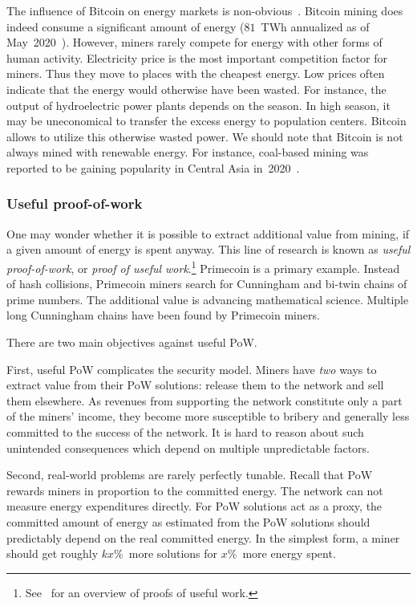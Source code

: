 The influence of Bitcoin on energy markets is non-obvious~\cite{Carter2020}.
Bitcoin mining does indeed consume a significant amount of energy ($81$~TWh annualized as of May~2020~\cite{Rauchs2020}).
However, miners rarely compete for energy with other forms of human activity.
Electricity price is the most important competition factor for miners.
Thus they move to places with the cheapest energy.
Low prices often indicate that the energy would otherwise have been wasted.
For instance, the output of hydroelectric power plants depends on the season.
In high season, it may be uneconomical to transfer the excess energy to population centers.
Bitcoin allows to utilize this otherwise wasted power.
We should note that Bitcoin is not always mined with renewable energy.
For instance, coal-based mining was reported to be gaining popularity in Central Asia in~2020~\cite{8BTCStaff2020}.


\subsubsection*{Useful proof-of-work}

One may wonder whether it is possible to extract additional value from mining, if a given amount of energy is spent anyway.
This line of research is known as \textit{useful proof-of-work}, or \textit{proof of useful work}.\footnote{See~\cite{Ball2017} for an overview of proofs of useful work.}
Primecoin is a primary example.
Instead of hash collisions, Primecoin miners search for Cunningham and bi-twin chains of prime numbers.
The additional value is advancing mathematical science.
Multiple long Cunningham chains have been found by Primecoin miners.

There are two main objectives against useful PoW.

First, useful PoW complicates the security model.
Miners have \textit{two} ways to extract value from their PoW solutions: release them to the network and sell them elsewhere.
As revenues from supporting the network constitute only a part of the miners' income, they become more susceptible to bribery and generally less committed to the success of the network.
It is hard to reason about such unintended consequences which depend on multiple unpredictable factors.

Second, real-world problems are rarely perfectly tunable.
Recall that PoW rewards miners in proportion to the committed energy.
The network can not measure energy expenditures directly.
For PoW solutions act as a proxy, the committed amount of energy as estimated from the PoW solutions should predictably depend on the real committed energy.
In the simplest form, a miner should get roughly $kx\%$~more solutions for $x\%$~more energy spent.

